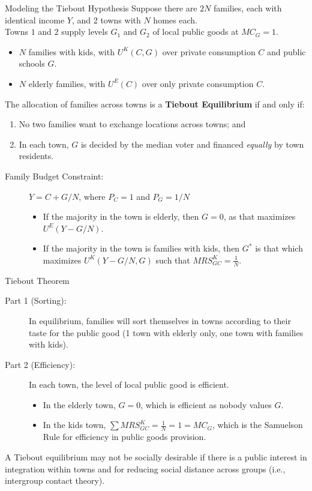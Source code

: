 \documentclass[8pt]{extarticle}
\begin{document}
  \begin{problem}{Modeling the Tiebout Hypothesis}
    Suppose there are $2N$ families, each with identical income $Y$, and 2 towns with $N$ homes each.\\

    Towns $1$ and $2$ supply levels $G_1$ and $G_2$ of local public goods at $MC_G = 1$.
    \begin{itemize}
      \item $N$ families with kids, with $U^K(C,G)$ over private consumption $C$ and public schools $G$.
      \item $N$ elderly families, with $U^E(C)$ over only private consumption $C$.
    \end{itemize}
    The allocation of families across towns is a \textbf{Tiebout Equilibrium} if and only if:
    \begin{enumerate}[(1)]
      \item No two families want to exchange locations across towns; and
      \item In each town, $G$ is decided by the median voter and financed \textit{equally} by town residents.
    \end{enumerate}
    \begin{description}
      \item[Family Budget Constraint:] $Y = C + G/N$, where $P_C = 1$ and $P_G = 1/N$
        \begin{itemize}
          \item If the majority in the town is elderly, then $G = 0$, as that maximizes $U^E(Y-G/N)$. 
          \item If the majority in the town is families with kids, then $G^*$ is that which maximizes $U^K(Y-G/N,G)$ such that $MRS_{GC}^K = \frac{1}{N}$.
        \end{itemize}
    \end{description}
    \begin{problem}{Tiebout Theorem}
      \begin{description}
        \item[Part 1 (Sorting):] In equilibrium, families will sort themselves in towns according to their taste for the public good (1 town with elderly only, one town with families with kids).
        \item[Part 2 (Efficiency):] In each town, the level of local public good is efficient.
          \begin{itemize}
            \item In the elderly town, $G = 0$, which is efficient as nobody values $G$.
            \item In the kids town, $\sum MRS_{GC}^{K} = \frac{1}{N} = 1 = MC_G$, which is the Samuelson Rule for efficiency in public goods provision.
          \end{itemize}
      \end{description}
    \end{problem}
    A Tiebout equilibrium may not be socially desirable if there is a public interest in integration within towns and for reducing social distance across groups (i.e., intergroup contact theory).
  \end{problem}
\end{document}
